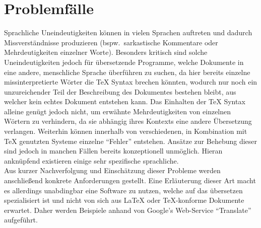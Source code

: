 

\section{Problemfälle}
Sprachliche Uneindeutigkeiten können in vielen Sprachen auftreten und dadurch Missverständnisse produzieren (bspw.\ sarkastische Kommentare oder Mehrdeutigkeiten einzelner Worte). Besonders kritisch sind solche Uneindeutigkeiten jedoch für übersetzende Programme, welche Dokumente in eine andere, menschliche Sprache überführen zu suchen, da hier bereits einzelne missinterpretierte Wörter die \TeX{} Syntax brechen könnten, wodurch nur noch ein unzureichender Teil der Beschreibung des Dokumentes bestehen bleibt, aus welcher kein echtes Dokument entstehen kann. Das Einhalten der \TeX{} Syntax alleine genügt jedoch nicht, um erwähnte Mehrdeutigkeiten von einzelnen Wörtern zu verhindern, da sie abhängig ihres Kontexts eine andere Übersetzung verlangen.%
Weiterhin können innerhalb von verschiedenen, in Kombination mit \TeX{} genutzten Systeme einzelne \enquote{Fehler} entstehen. Ansätze zur Behebung dieser sind jedoch in manchen Fällen bereits konzeptionell unmöglich. Hieran anknüpfend existieren einige sehr spezifische sprachliche.\\%
\noindent
Aus kurzer Nachverfolgung und Einschätzung dieser Probleme werden anschließend konkrete Anforderungen gestellt. Eine Erläuterung dieser Art macht es allerdings unabdingbar eine Software zu nutzen, welche auf das übersetzen spezialisiert ist und nicht von sich aus \LaTeX{} oder \TeX{}-konforme Dokumente erwartet. Daher werden Beispiele anhand von Google's Web-Service \enquote{Translate} aufgeführt.%




